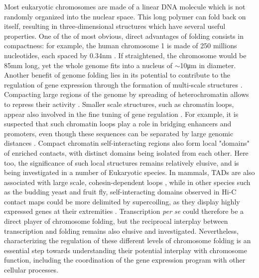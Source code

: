Most eukaryotic chromosomes are made of a linear DNA molecule which is not randomly organized into the nuclear space. This long polymer can fold back on itself, resulting in three-dimensional structures which have several useful properties. One of the of most obvious, direct advantages of folding consists in compactness: for example, the human chromosome 1 is made of 250 millions nucleotides, each spaced by 0.34\si{\nano\meter} \cite {langridgeMolecularConfigurationDeoxyribonucleic1960}. If straightened, the chromosome would be 85\si{\milli\meter} long, yet the whole genome fits into a nucleus of $\sim$10\si{\micro\meter} in diameter. Another benefit of genome folding lies in its potential to contribute to the regulation of gene expression through the formation of multi-scale structures \cite{bonevOrganizationFunction3D2016}. Compacting large regions of the genome by spreading of \Gls{heterochromatin} allows to repress their activity \cite{gilbertChromatinArchitectureHuman2004}. Smaller scale structures, such as chromatin loops, appear also involved in the fine tuning of gene regulation \cite{bonevOrganizationFunction3D2016}. For example, it is suspected that such \Gls{chromatin} loops play a role in bridging enhancers and promoters, even though these sequences can be separated by large genomic distances \cite{doyleChromatinLoopsAllosteric2014,dowenMultipleStructuralMaintenance2013,dorsettCohesinActiveGenes2013}. Compact chromatin self-interacting regions also form local "domains" of enriched contacts, with distinct domains being isolated from each other. Here too, the significance of such local structures remains relatively elusive, and is being investigated in a number of Eukaryotic species. In mammals, \acrfull{TAD}s are also associated with large scale, cohesin-dependent loops \cite{ji3DChromosomeRegulatory2016}, while in other species such as the budding yeast and fruit fly, self-interacting domains observed in Hi-C contact maps could be more delimited by supercoiling, as they display highly expressed genes at their extremities \cite{hsiehMappingNucleosomeResolution2015,chathothChromatinArchitectureReorganization2019}. Transcription \textit{per se} could therefore be a direct player of chromosome folding, but the reciprocal interplay between transcription and folding remains also elusive and investigated. Nevertheless, characterizing the regulation of these different levels of chromosome folding is an essential step towards understanding their potential interplay with chromosome function, including the coordination of the gene expression program with other cellular processes.


